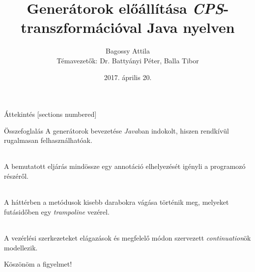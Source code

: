 \documentclass{beamer}
\title{Generátorok előállítása \textit{CPS}-transzformációval Java nyelven}
\date{2017. április 20.}
\author[My name]{Bagossy Attila\\ \footnotesize Témavezetők: Dr. Battyányi Péter, Balla Tibor \vspace{5em}}
\institute{Debreceni Egyetem, Informatikai Kar, Számítógéptudományi Tanszék}
\begin{document}
  \maketitle

  \begin{frame}{Áttekintés}
    [sections numbered]
    \tableofcontents[hideallsubsections]
  \end{frame}

  

  

  

  

  \begin{frame}{Összefoglalás}
    A generátorok bevezetése \textit{Java}ban indokolt, hiszen rendkívül rugalmasan felhasználhatóak.

    \hfill \\

    A bemutatott eljárás mindössze egy annotáció elhelyezését igényli a programozó részéről.

    \hfill \\

    A háttérben a metódusok kisebb darabokra vágása történik meg, melyeket futásidőben egy \textit{trampoline} vezérel.

    \hfill \\

    A vezérlési szerkezeteket elágazások és megfelelő módon szervezett \textit{continuation}ök modellezik.
  \end{frame}

  \begin{frame}[standout]
    Köszönöm a figyelmet!
  \end{frame}

\end{document}
